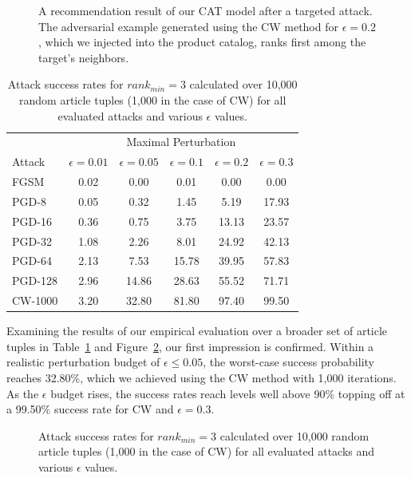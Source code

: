 \begin{figure}[H]
	\centering
	
	\caption{A recommendation result of our \ac{CAT} model after a targeted attack. The adversarial example generated using the \ac{CW} method for $\epsilon=0.2$, which we injected into the product catalog, ranks first among the target's neighbors.}
	\label{fig:curr-adv-reco}
\end{figure}
\begin{table}[H]
	\centering
	\begin{tabular}{ lccccc } 
		\toprule		
		& \multicolumn{5}{c}{Maximal Perturbation} \\
		\cmidrule{2-6}
		Attack & $\epsilon = 0.01$ & $\epsilon = 0.05$ & $\epsilon = 0.1$  & $\epsilon = 0.2$ & $\epsilon = 0.3$  \\
		\midrule
		FGSM & 0.02 & 0.00 & 0.01 & 0.00 & 0.00 \\
		PGD-8 & 0.05 & 0.32 & 1.45 & 5.19 & 17.93 \\
		PGD-16 & 0.36 & 0.75 & 3.75 & 13.13 & 23.57 \\
		PGD-32 & 1.08 & 2.26 & 8.01 & 24.92 & 42.13 \\
		PGD-64 & 2.13 & 7.53 & 15.78 & 39.95 & 57.83 \\
		PGD-128 & 2.96 & 14.86 & 28.63 & 55.52 & 71.71 \\
		CW-1000 & 3.20 & 32.80 & 81.80 & 97.40 & 99.50 \\
		\bottomrule
	\end{tabular}
	\caption{Attack success rates for $rank_{min}=3$ calculated over 10,000 random article tuples (1,000 in the case of \acs{CW}) for all evaluated attacks and various $\epsilon$ values.}
	\label{tab:curriculum-adv-training-results}
\end{table}
Examining the results of our empirical evaluation over a broader set of article tuples in Table~\ref{tab:curriculum-adv-training-results} and Figure~\ref{fig:top3-curriculum-adv-success}, our first impression is confirmed. Within a realistic perturbation budget of $\epsilon\le0.05$, the worst-case success probability reaches 32.80\%, which we achieved using the \ac{CW} method with 1,000 iterations. As the $\epsilon$ budget rises, the success rates reach levels well above 90\% topping off at a 99.50\% success rate for \ac{CW} and $\epsilon=0.3$. 
\begin{figure}[H]
	\centering
	
	\caption{Attack success rates for $rank_{min}=3$ calculated over 10,000 random article tuples (1,000 in the case of \acs{CW}) for all evaluated attacks and various $\epsilon$ values.}
	\label{fig:top3-curriculum-adv-success}
\end{figure}
